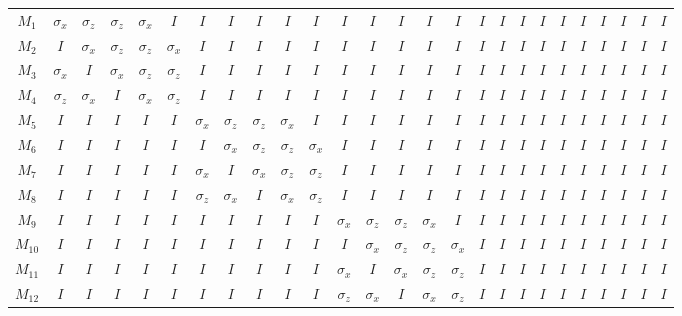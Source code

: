 \documentclass{report}
\newcommand{\X}{\sigma_x}
\newcommand{\Z}{\sigma_z}
\begin{document}
\begin{table}
{\setlength{\tabcolsep}{0.1em}
\begin{tabular}{c|ccccc|ccccc|ccccc|ccccc|ccccc}
$M_1$ & $\X$ & $\Z$ & $\Z$ & $\X$ & $I$ & $I$ & $I$ & $I$ & $I$ & $I$ & 
$I$ & $I$ & $I$ & $I$ & $I$ & $I$ & $I$ & $I$ & $I$ & $I$ & $I$ & $I$ & 
$I$ & $I$ & $I$ \\
$M_2$ & $I$ & $\X$ & $\Z$ & $\Z$ & $\X$ & $I$ & $I$ & $I$ & $I$ & $I$ & 
$I$ & $I$ & $I$ & $I$ & $I$ & $I$ & $I$ & $I$ & $I$ & $I$ & $I$ & $I$ & 
$I$ & $I$ & $I$ \\
$M_3$ & $\X$ & $I$ & $\X$ & $\Z$ & $\Z$ & $I$ & $I$ & $I$ & $I$ & $I$ & 
$I$ & $I$ & $I$ & $I$ & $I$ & $I$ & $I$ & $I$ & $I$ & $I$ & $I$ & $I$ & 
$I$ & $I$ & $I$ \\
$M_4$ & $\Z$ & $\X$ & $I$ & $\X$ & $\Z$ & $I$ & $I$ & $I$ & $I$ & $I$ & 
$I$ & $I$ & $I$ & $I$ & $I$ & $I$ & $I$ & $I$ & $I$ & $I$ & $I$ & $I$ & 
$I$ & $I$ & $I$ \\
$M_5$ & $I$ & $I$ & $I$ & $I$ & $I$ & $\X$ & $\Z$ & $\Z$ & $\X$ & $I$ & 
$I$ & $I$ & $I$ & $I$ & $I$ & $I$ & $I$ & $I$ & $I$ & $I$ & $I$ & $I$ & 
$I$ & $I$ & $I$ \\
$M_6$ & $I$ & $I$ & $I$ & $I$ & $I$ & $I$ & $\X$ & $\Z$ & $\Z$ & $\X$ & 
$I$ & $I$ & $I$ & $I$ & $I$ & $I$ & $I$ & $I$ & $I$ & $I$ & $I$ & $I$ & 
$I$ & $I$ & $I$ \\
$M_7$ & $I$ & $I$ & $I$ & $I$ & $I$ & $\X$ & $I$ & $\X$ & $\Z$ & $\Z$ & 
$I$ & $I$ & $I$ & $I$ & $I$ & $I$ & $I$ & $I$ & $I$ & $I$ & $I$ & $I$ & 
$I$ & $I$ & $I$ \\
$M_8$ & $I$ & $I$ & $I$ & $I$ & $I$ & $\Z$ & $\X$ & $I$ & $\X$ & $\Z$ & 
$I$ & $I$ & $I$ & $I$ & $I$ & $I$ & $I$ & $I$ & $I$ & $I$ & $I$ & $I$ & 
$I$ & $I$ & $I$ \\
$M_9$ & $I$ & $I$ & $I$ & $I$ & $I$ & $I$ & $I$ & $I$ & $I$ & $I$ & $\X$ 
& $\Z$ & $\Z$ & $\X$ & $I$ & $I$ & $I$ & $I$ & $I$ & $I$ & $I$ & $I$ & 
$I$ & $I$ & $I$ \\
$M_{10}$ & $I$ & $I$ & $I$ & $I$ & $I$ & $I$ & $I$ & $I$ & $I$ & $I$ & $I$ 
& $\X$ & $\Z$ & $\Z$ & $\X$ & $I$ & $I$ & $I$ & $I$ & $I$ & $I$ & $I$ & 
$I$ & $I$ & $I$ \\
$M_{11}$ & $I$ & $I$ & $I$ & $I$ & $I$ & $I$ & $I$ & $I$ & $I$ & $I$ & 
$\X$ & $I$ & $\X$ & $\Z$ & $\Z$ & $I$ & $I$ & $I$ & $I$ & $I$ & $I$ & 
$I$ & $I$ & $I$ & $I$ \\
$M_{12}$ & $I$ & $I$ & $I$ & $I$ & $I$ & $I$ & $I$ & $I$ & $I$ & $I$ & 
$\Z$ & $\X$ & $I$ & $\X$ & $\Z$ & $I$ & $I$ & $I$ & $I$ & $I$ & $I$ & 
$I$ & $I$ & $I$ & $I$ \\

\end{tabular}}
\end{table}
\end{document}
